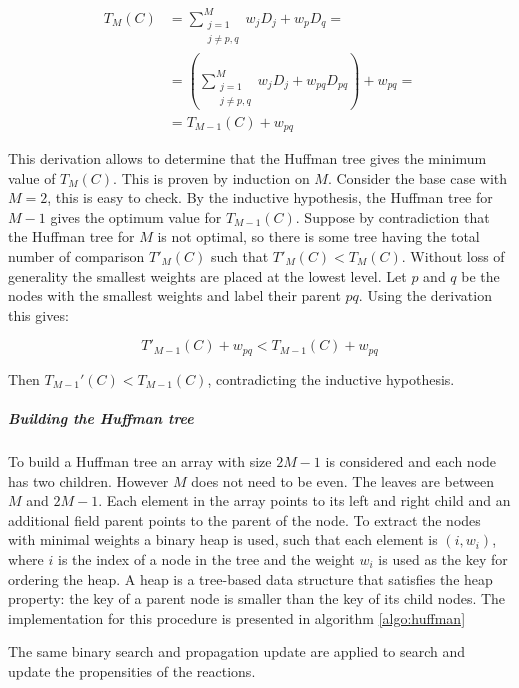         \begin{align*}
          T_M(C) &= \sum\limits_{\substack{j=1\\j\neq p,q}}^Mw_jD_j +w_pD_q =\\
                 &= \left(\sum\limits_{\substack{j=1\\j\neq p,q}}^Mw_jD_j + w_{pq}D_{pq}\right) + w_{pq}=\\
                 &= T_{M-1}(C)+w_{pq}
        \end{align*}

        This derivation allows to determine that the Huffman tree gives the minimum value of $T_M(C)$.
        This is proven by induction on $M$.
        Consider the base case with $M=2$, this is easy to check.
        By the inductive hypothesis, the Huffman tree for $M-1$ gives the optimum value for $T_{M-1}(C)$.
        Suppose by contradiction that the Huffman tree for $M$ is not optimal, so there is some tree having the total number of comparison $T'_{M}(C)$ such that $T'_M(C)<T_M(C)$.
        Without loss of generality the smallest weights are placed at the lowest level.
        Let $p$ and $q$ be the nodes with the smallest weights and label their parent $pq$.
        Using the derivation this gives:

        $$T'_{M-1}(C) +w_{pq}< T_{M-1}(C)+w_{pq}$$

        Then $T_{M-1}'(C)< T_{M-1}(C)$, contradicting the inductive hypothesis.

        \subparagraph{Building the Huffman tree}
        To build a Huffman tree an array with size $2M-1$ is considered and each node has two children.
        However $M$ does not need to be even.
        The leaves are between $M$ and $2M-1$.
        Each element in the array points to its left and right child and an additional field parent points to the parent of the node.
        To extract the nodes with minimal weights a binary heap is used, such that each element is $(i,w_i)$, where $i$ is the index of a node in the tree and the weight $w_i$ is used as the key for ordering the heap.
        A heap is a tree-based data structure that satisfies the heap property: the key of a parent node is smaller than the key of its child nodes.
        The implementation for this procedure is presented in algorithm \ref{algo:huffman}

        

        The same binary search and propagation update are applied to search and update the propensities of the reactions.

